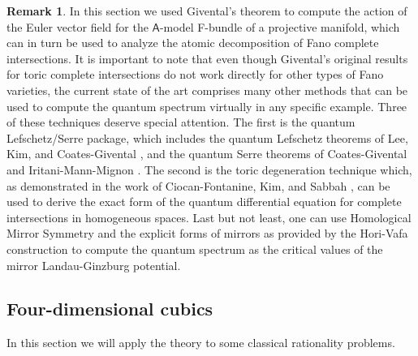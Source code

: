\documentclass[twoside,leqno]{article}
\numberwithin{equation}{section}
\theoremstyle{plain}
\theoremstyle{definition}
\newtheorem{remark}[equation]{Remark}
\begin{document}
\begin{remark}
\label{rem-other.techniques} In this section we used Givental's theorem to compute the action of the Euler vector field for the $\mathsf{A}$-model F-bundle of a projective manifold, which can in turn be used to analyze the atomic decomposition of Fano complete intersections. It is important to note that even though Givental's original results  for toric complete intersections do not work directly for other types of Fano varieties, the current state of the art comprises many other methods that can be used to compute the quantum spectrum virtually in any specific example. Three of these techniques deserve special attention. The first is  the quantum Lefschetz/Serre package, which includes the quantum Lefschetz theorems of Lee, Kim, and Coates-Givental \cite{Lee_YP-qLefschetz,Kim-qLefschetz,CoatesGivental}, and the quantum Serre theorems of Coates-Givental and  Iritani-Mann-Mignon \cite{CoatesGivental,IritaniMannMignon}. The second is the toric degeneration  technique which, as demonstrated in the work of Ciocan-Fontanine, Kim, and Sabbah \cite{CFKS}, can be used to derive the exact form of the quantum differential equation for complete intersections in homogeneous spaces. Last but not least, one can use Homological Mirror Symmetry and the explicit forms of 
mirrors as provided by the Hori-Vafa construction \cite{Hori_Vafa_Mirror_symmetry} to compute the quantum spectrum as the critical values of the mirror Landau-Ginzburg potential.
\end{remark}



\subsection{Four-dimensional cubics} \label{ssec:Cubics}

In this section we will apply the theory to some classical rationality problems.
\end{document}
